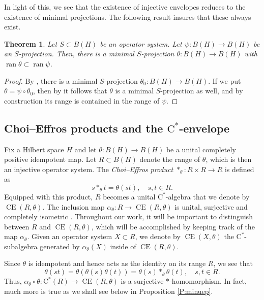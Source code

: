 \documentclass[10pt]{amsart}
\newcommand{\rC}{\mathrm{C}}
\newcommand{\CE}{\operatorname{CE}}
\newcommand{\ran}{\operatorname{ran}}
\newtheorem{theorem}[lemma]{Theorem}
\theoremstyle{definition}
\begin{document}
In light of this, we see that the existence of injective envelopes reduces to the existence of minimal projections. The following result insures that these always exist.

\begin{theorem}\label{T:minproj}
Let $S\subset B(H)$ be an operator system.  Let $\psi:B(H)\to B(H)$ be an $S$-projection. Then, there is a minimal $S$-projection $\theta:B(H)\to B(H)$ with $\ran\theta\subset \ran \psi$.
\end{theorem}
\begin{proof}
By \cite[Theorem 3.5]{hamana1979}, there is a minimal $S$-projection $\theta_0:B(H)\to B(H)$. If we put $\theta=\psi\circ \theta_0$, then by \cite[Proposition 2.11]{paulsen2011} it follows that $\theta$ is a minimal $S$-projection as well, and by construction its range is contained in the range of $\psi$.
\end{proof}



\subsection{Choi--Effros products and the $\rC^*$-envelope}
Fix a Hilbert space $H$ and let $\theta:B(H)\to B(H)$ be a unital completely positive idempotent map. Let $R\subset B(H)$ denote the range of $\theta$, which is then an injective operator system. The \emph{Choi--Effros product} $*_\theta:R\times R\to R$  is defined as
\[
s *_\theta t=\theta(st), \quad s,t\in R.
\]
Equipped with this product, $R$ becomes a unital $\rC^*$-algebra that we  denote by  $\CE(R,\theta)$. The inclusion map $\alpha_\theta: R\to \CE(R,\theta)$ is unital, surjective and completely isometric \cite[Theorem 3.1]{CE1977}. Throughout our work, it will be important to distinguish between $R$ and $\CE(R,\theta)$, which will be accomplished by keeping track of the map $\alpha_\theta$. Given an operator system  $X\subset R$, we denote by $\CE(X,\theta)$ the $\rC^*$-subalgebra generated by $\alpha_\theta(X)$ inside of $\CE(R,\theta)$. 


Since $\theta$ is idempotent and hence acts as the identity on its range $R$, we see that 
\[
\theta(st)=\theta(\theta(s)\theta(t))=\theta(s)*_\theta \theta(t), \quad s,t\in R.
\]
Thus,  $\alpha_\theta\circ \theta:\rC^*(R)\to \CE(R,\theta)$ is a surjective $*$-homomorphism. In fact, much more is true as we shall see below in Proposition \ref{P:minuep}.
\end{document}
